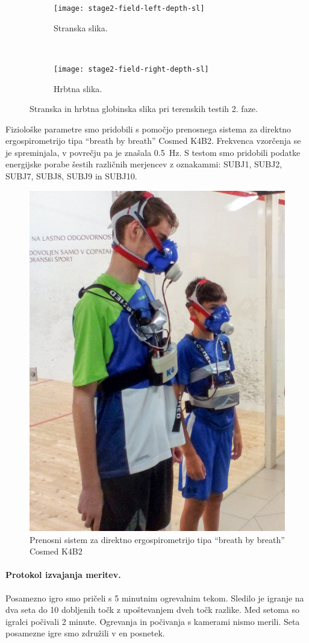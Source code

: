 \begin{figure}[!htb]
	\centering
	\begin{subfigure}[t]{0.45\columnwidth}
		\texttt{[image: stage2-field-left-depth-sl]}
		\caption{Stranska slika.}
	\end{subfigure}
	~
	\begin{subfigure}[t]{0.45\columnwidth}
		\texttt{[image: stage2-field-right-depth-sl]}
		\caption{Hrbtna slika.}
	\end{subfigure}
	\caption{Stranska in hrbtna globinska slika pri terenskih testih 2. faze.}
	\label{fig:stage2-field-of-depth}
\end{figure}

Fiziološke parametre smo pridobili s pomočjo prenosnega sistema za direktno ergospirometrijo tipa ``breath  by breath'' Cosmed K4B2. Frekvenca vzorčenja se je spreminjala, v povrečju pa je znašala \SI{0.5}{\hertz}. S testom smo pridobili podatke energijske porabe šestih različnih merjencev z oznakammi: SUBJ1, SUBJ2, SUBJ7, SUBJ8, SUBJ9 in SUBJ10.


\begin{figure}[!htb]
	\centering
	\includegraphics[width=0.4\columnwidth]{./Slike/squash-maske-corrected.jpg}	
	\caption{Prenosni sistem za direktno ergospirometrijo tipa ``breath  by breath'' Cosmed K4B2}
	\label{fig:maske}
\end{figure}


\paragraph{Protokol izvajanja meritev.}
Posamezno igro smo pričeli s 5 minutnim ogrevalnim tekom. Sledilo je igranje na dva seta do 10 dobljenih točk z upoštevanjem dveh točk razlike. Med setoma so igralci počivali 2 minute. Ogrevanja in počivanja s kamerami nismo merili. Seta posamezne igre smo združili v en posnetek.
